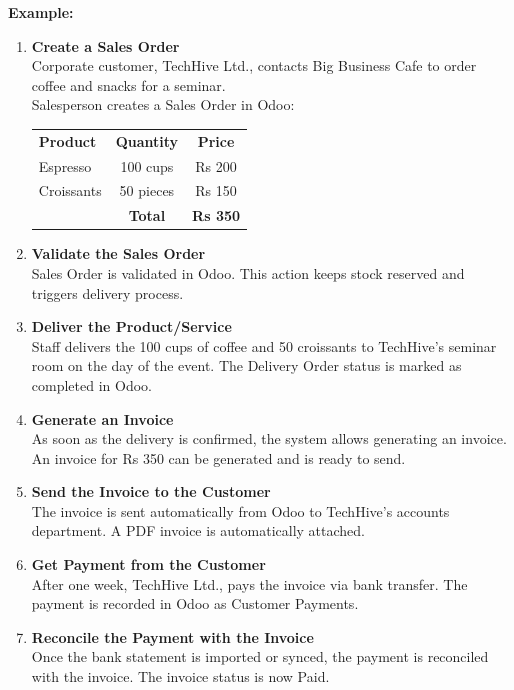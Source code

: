 \documentclass[11pt,a4paper]{article}
\begin{document}
\medskip
\noindent\textbf{Example:}
\begin{enumerate}
    \item \textbf{Create a Sales Order} \\
    Corporate customer, TechHive Ltd., contacts Big Business Cafe to order coffee and snacks for a seminar. \\
    Salesperson creates a Sales Order in Odoo:
    \begin{tabular}{l c c}
        \textbf{Product} & \textbf{Quantity} & \textbf{Price} \\
        Espresso & 100 cups & Rs 200 \\
        Croissants & 50 pieces & Rs 150 \\
        & \textbf{Total} & \textbf{Rs 350} \\
    \end{tabular}

    \item \textbf{Validate the Sales Order} \\
    Sales Order is validated in Odoo. This action keeps stock reserved and triggers delivery process.

    \item \textbf{Deliver the Product/Service} \\
    Staff delivers the 100 cups of coffee and 50 croissants to TechHive's seminar room on the day of the event. The Delivery Order status is marked as completed in Odoo.

    \item \textbf{Generate an Invoice} \\
    As soon as the delivery is confirmed, the system allows generating an invoice. An invoice for Rs 350 can be generated and is ready to send.

    \item \textbf{Send the Invoice to the Customer} \\
    The invoice is sent automatically from Odoo to TechHive's accounts department. A PDF invoice is automatically attached.

    \item \textbf{Get Payment from the Customer} \\
    After one week, TechHive Ltd., pays the invoice via bank transfer. The payment is recorded in Odoo as Customer Payments.

    \item \textbf{Reconcile the Payment with the Invoice} \\
    Once the bank statement is imported or synced, the payment is reconciled with the invoice. The invoice status is now Paid.
\end{enumerate}
\end{document}
